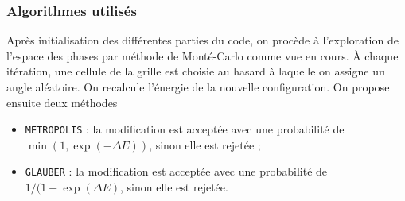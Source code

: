 \documentclass[a4paper, openany, 11pt]{article}
\begin{document}
\subsubsection{Algorithmes utilisés}

Après initialisation des différentes parties du code, on procède à l'exploration de l'espace des
phases par méthode de Monté-Carlo comme vue en cours. À chaque itération, une cellule de la grille
est choisie au hasard à laquelle on assigne un angle aléatoire. On recalcule l'énergie de la
nouvelle configuration. On propose ensuite deux méthodes
\begin{itemize}
    \item  \texttt{METROPOLIS} : la modification est acceptée avec une probabilité de $\min(1, \exp(-\Delta
        E))$, sinon elle est rejetée ;
    \item \texttt{GLAUBER} : la modification est acceptée avec une probabilité de $1/(1+\exp(\Delta
        E)$, sinon elle est rejetée.
\end{itemize}
\end{document}
